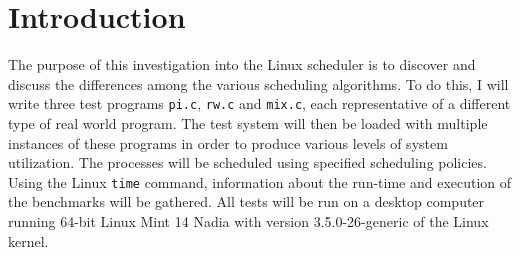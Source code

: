 ﻿\section{Introduction}

The purpose of this investigation into the Linux scheduler is to discover and discuss the differences among the various scheduling algorithms.  To do this, I will write three test programs \texttt{pi.c}, \texttt{rw.c} and \texttt{mix.c}, each representative of a different type of real world program.  The test system will then be loaded with multiple instances of these programs in order to produce various levels of system utilization.  The processes will be scheduled using specified scheduling policies.  Using the Linux \texttt{time} command, information about the run-time and execution of the benchmarks will be gathered.  All tests will be run on a desktop computer running 64-bit Linux Mint 14 Nadia with version
3.5.0-26-generic of the Linux kernel.
